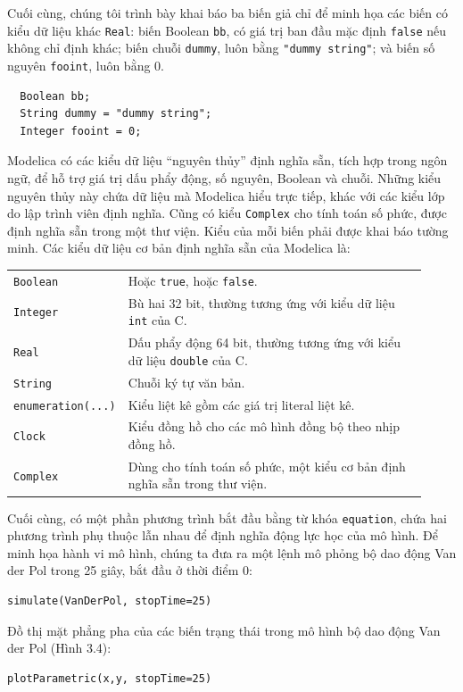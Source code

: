 Cuối cùng, chúng tôi trình bày khai báo ba biến giả chỉ để minh họa các biến có kiểu dữ liệu khác \texttt{Real}: biến Boolean \texttt{bb}, có giá trị ban đầu mặc định \texttt{false} nếu không chỉ định khác; biến chuỗi \texttt{dummy}, luôn bằng \texttt{"dummy string"}; và biến số nguyên \texttt{fooint}, luôn bằng 0.
\begin{verbatim}
  Boolean bb;
  String dummy = "dummy string";
  Integer fooint = 0;
\end{verbatim}
Modelica có các kiểu dữ liệu ``nguyên thủy'' định nghĩa sẵn, tích hợp trong ngôn ngữ, để hỗ trợ giá trị dấu phẩy động, số nguyên, Boolean và chuỗi. Những kiểu nguyên thủy này chứa dữ liệu mà Modelica hiểu trực tiếp, khác với các kiểu lớp do lập trình viên định nghĩa. Cũng có kiểu \texttt{Complex} cho tính toán số phức, được định nghĩa sẵn trong một thư viện. Kiểu của mỗi biến phải được khai báo tường minh. Các kiểu dữ liệu cơ bản định nghĩa sẵn của Modelica là:
\begin{center}
\begin{tabular}{p{0.20\linewidth}p{0.72\linewidth}}
\hline
\texttt{Boolean} & Hoặc \texttt{true}, hoặc \texttt{false}.\\
\texttt{Integer} & Bù hai 32 bit, thường tương ứng với kiểu dữ liệu \texttt{int} của C.\\
\texttt{Real} & Dấu phẩy động 64 bit, thường tương ứng với kiểu dữ liệu \texttt{double} của C.\\
\texttt{String} & Chuỗi ký tự văn bản.\\
\texttt{enumeration(...)} & Kiểu liệt kê gồm các giá trị literal liệt kê.\\
\texttt{Clock} & Kiểu đồng hồ cho các mô hình đồng bộ theo nhịp đồng hồ.\\
\texttt{Complex} & Dùng cho tính toán số phức, một kiểu cơ bản định nghĩa sẵn trong thư viện.\\
\hline
\end{tabular}
\end{center}

Cuối cùng, có một phần phương trình bắt đầu bằng từ khóa \texttt{equation}, chứa hai phương trình phụ thuộc lẫn nhau để định nghĩa động lực học của mô hình. Để minh họa hành vi mô hình, chúng ta đưa ra một lệnh mô phỏng bộ dao động Van der Pol trong 25 giây, bắt đầu ở thời điểm 0:
\begin{verbatim}
simulate(VanDerPol, stopTime=25)
\end{verbatim}
Đồ thị mặt phẳng pha của các biến trạng thái trong mô hình bộ dao động Van der Pol (Hình 3.4):
\begin{verbatim}
plotParametric(x,y, stopTime=25)
\end{verbatim}

